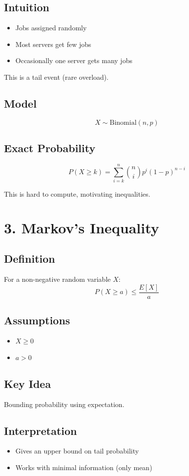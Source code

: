 \documentclass{article}
\begin{document}
\subsection*{Intuition}
\begin{itemize}
    \item Jobs assigned randomly
    \item Most servers get few jobs
    \item Occasionally one server gets many jobs
\end{itemize}

This is a tail event (rare overload).

\subsection*{Model}
\[
X \sim \text{Binomial}(n, p)
\]

\subsection*{Exact Probability}
\[
P(X \ge k) = \sum_{i=k}^{n} \binom{n}{i} p^i (1-p)^{n-i}
\]

This is hard to compute, motivating inequalities.

\section*{3. Markov's Inequality}

\subsection*{Definition}
For a non-negative random variable $X$:
\[
P(X \ge a) \le \frac{E[X]}{a}
\]

\subsection*{Assumptions}
\begin{itemize}
    \item $X \ge 0$
    \item $a > 0$
\end{itemize}

\subsection*{Key Idea}
Bounding probability using expectation.

\subsection*{Interpretation}
\begin{itemize}
    \item Gives an upper bound on tail probability
    \item Works with minimal information (only mean)
\end{itemize}
\end{document}
